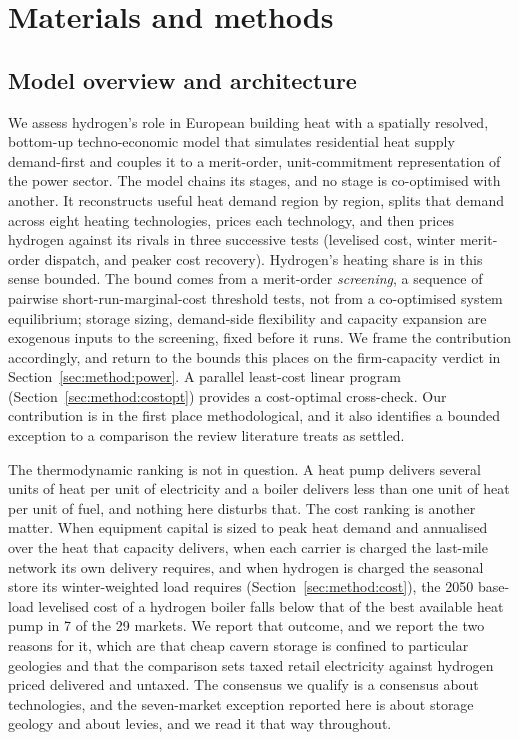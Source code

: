 \section{Materials and methods}
\label{sec:method}

\subsection{Model overview and architecture}
\label{sec:method:overview}

We assess hydrogen's role in European building heat with a spatially resolved,
bottom-up techno-economic model that simulates residential heat supply demand-first
and couples it to a merit-order, unit-commitment representation of the power sector. The model chains its stages, and no stage is co-optimised with another. It reconstructs useful heat demand region by region, splits that demand
across eight heating technologies, prices each technology, and then prices hydrogen
against its rivals in three successive tests (levelised cost, winter
merit-order dispatch, and peaker cost recovery). Hydrogen's heating share is in this
sense bounded. The bound comes from a merit-order
\emph{screening}, a sequence of pairwise short-run-marginal-cost threshold tests, not from a co-optimised system equilibrium; storage sizing, demand-side
flexibility and capacity expansion are exogenous inputs to the screening, fixed before it runs. We frame the contribution accordingly, and return to the bounds
this places on the firm-capacity verdict in Section~\ref{sec:method:power}. A parallel
least-cost linear program (Section~\ref{sec:method:costopt}) provides a
cost-optimal cross-check. Our contribution is in the first place methodological, and
it also identifies a bounded exception to a comparison the review literature treats as
settled.

The thermodynamic ranking is not in question. A heat pump delivers several units of
heat per unit of electricity and a boiler delivers less than one unit of heat per unit
of fuel, and nothing here disturbs that. The cost ranking is another matter. When
equipment capital is sized to peak heat demand and annualised over the heat that
capacity delivers, when each carrier is charged the last-mile network its
own delivery requires, and when hydrogen is charged the seasonal store its
winter-weighted load requires (Section~\ref{sec:method:cost}), the 2050 base-load
levelised cost of a hydrogen boiler falls below that of the best available heat pump in
7 of the 29 markets. We report that outcome, and we report the two reasons for it,
which are that cheap cavern storage is confined to particular geologies and that the
comparison sets taxed retail electricity against hydrogen priced
delivered and untaxed. The consensus we qualify
\citep{Rosenow2022PipeDream,Billerbeck2023Race} is a consensus about technologies, and the seven-market exception reported here is about storage geology and about
levies, and we read it that way throughout.

